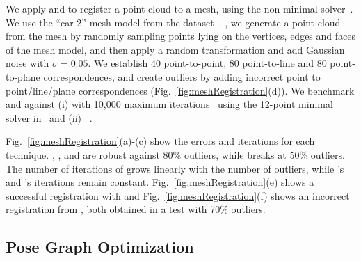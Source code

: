  We apply \GNCGM and \GNCTLS to register a point cloud to a mesh, 
 using the non-minimal solver~\cite{Briales17cvpr-registration}. 
 We use the ``car-2'' mesh model from the \PASCALplus dataset~\cite{Xiang2014WACV-PASCAL+}. , we generate a point cloud from the mesh by randomly sampling points lying on the vertices, edges and faces of the mesh model, and then apply a random transformation and add Gaussian noise with $\sigma=0.05$. We establish 40 point-to-point, 80 point-to-line and 80 point-to-plane correspondences, and create outliers by adding 
 incorrect point to point/line/plane 
correspondences (Fig.~\ref{fig:meshRegistration}{(d)}). 
%
We benchmark \GNCGM and \GNCTLS against (i) \ransac with 10,000 maximum iterations~ using the 12-point minimal solver in~\cite{Khoshelham16jprs-ClosedformSolutionPlaneCorrespondences} and (ii) \adapt~\cite{Tzoumas19iros-outliers}. 

Fig.~\ref{fig:meshRegistration}{(a)-(c)} show the errors and iterations for each technique. \GNCGM, \GNCTLS, and \adapt are robust against 80\% outliers, while \ransac breaks at 50\% outliers. The number of iterations of \adapt grows linearly with the number of outliers, while \GNCGM's and \GNCTLS's iterations remain constant. 
Fig.~\ref{fig:meshRegistration}{(e)} shows a successful registration with \GNCTLS and 
Fig.~\ref{fig:meshRegistration}{(f)} shows an incorrect registration from \ransac, 
both obtained in a test with 70\% outliers. 

\subsection{Pose Graph Optimization}
\label{sec:PGO}

